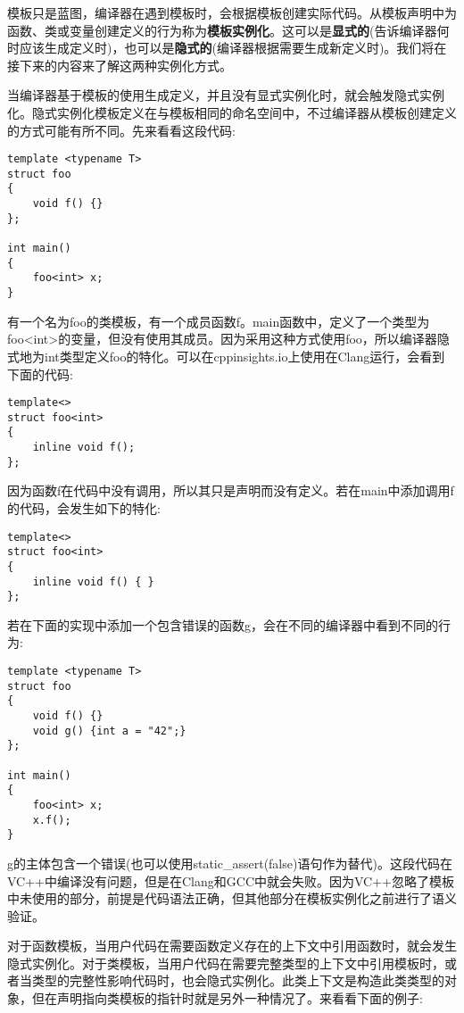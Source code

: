 
模板只是蓝图，编译器在遇到模板时，会根据模板创建实际代码。从模板声明中为函数、类或变量创建定义的行为称为\textbf{模板实例化}。这可以是\textbf{显式的}(告诉编译器何时应该生成定义时)，也可以是\textbf{隐式的}(编译器根据需要生成新定义时)。我们将在接下来的内容来了解这两种实例化方式。


当编译器基于模板的使用生成定义，并且没有显式实例化时，就会触发隐式实例化。隐式实例化模板定义在与模板相同的命名空间中，不过编译器从模板创建定义的方式可能有所不同。先来看看这段代码:

\begin{lstlisting}[style=styleCXX]
template <typename T>
struct foo
{
	void f() {}
};

int main()
{
	foo<int> x;
}
\end{lstlisting}

有一个名为foo的类模板，有一个成员函数f。main函数中，定义了一个类型为foo<int>的变量，但没有使用其成员。因为采用这种方式使用foo，所以编译器隐式地为int类型定义foo的特化。可以在cppinsights.io上使用在Clang运行，会看到下面的代码:

\begin{lstlisting}[style=styleCXX]
template<>
struct foo<int>
{
	inline void f();
};
\end{lstlisting}

因为函数f在代码中没有调用，所以其只是声明而没有定义。若在main中添加调用f的代码，会发生如下的特化:

\begin{lstlisting}[style=styleCXX]
template<>
struct foo<int>
{
	inline void f() { }
};
\end{lstlisting}

若在下面的实现中添加一个包含错误的函数g，会在不同的编译器中看到不同的行为:

\begin{lstlisting}[style=styleCXX]
template <typename T>
struct foo
{
	void f() {}
	void g() {int a = "42";}
};

int main()
{
	foo<int> x;
	x.f();
}
\end{lstlisting}

g的主体包含一个错误(也可以使用static\_assert(false)语句作为替代)。这段代码在VC++中编译没有问题，但是在Clang和GCC中就会失败。因为VC++忽略了模板中未使用的部分，前提是代码语法正确，但其他部分在模板实例化之前进行了语义验证。


对于函数模板，当用户代码在需要函数定义存在的上下文中引用函数时，就会发生隐式实例化。对于类模板，当用户代码在需要完整类型的上下文中引用模板时，或者当类型的完整性影响代码时，也会隐式实例化。此类上下文是构造此类类型的对象，但在声明指向类模板的指针时就是另外一种情况了。来看看下面的例子:

